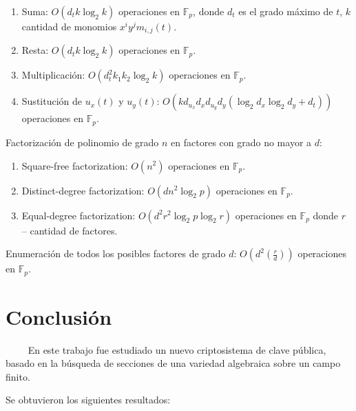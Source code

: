 \documentclass[12pt]{article}
\begin{document}
\begin{enumerate}
\item Suma: $O(d_tk\log_2k)$ operaciones en $\mathbb{F}_p$, donde $d_t$ es el grado m\'aximo de  $t$, $k$ cantidad de monomios $x^iy^jm_{i,j}(t)$.
\item Resta: $O(d_tk\log_2k)$ operaciones en $\mathbb{F}_p$.
\item Multiplicaci\'on: $O(d_t^2k_1k_2\log_2k)$ operaciones en $\mathbb{F}_p$.
\item Sustituci\'on de $u_x(t)$ y $u_y(t)$: $O(kd_{u_x}d_xd_{u_y}d_y(\log_2d_x\log_2d_y+d_t))$ operaciones en $\mathbb{F}_p$.
\end{enumerate}
Factorizaci\'on de polinomio de grado $n$ en factores con grado no mayor a $d$:

\begin{enumerate}
\item Square-free factorization: $O(n^2)$ operaciones en $\mathbb{F}_p$.
\item Distinct-degree factorization: $O(dn^2\log_2p)$ operaciones en $\mathbb{F}_p$.
\item Equal-degree factorization: $O(d^2r^2\log_2p\log_2 r )$ operaciones en $\mathbb{F}_p$ donde $r$ – cantidad de factores.
\end{enumerate}
Enumeraci\'on de todos los posibles factores de grado $d$: $O(d^2(\frac{r}{d}))$ operaciones en $\mathbb{F}_p$.



\section*{Conclusi\'on}

$\qquad$ En este trabajo fue estudiado un nuevo criptosistema de clave p\'ublica, basado en la b\'usqueda de secciones de una variedad algebraica sobre un campo finito.

Se obtuvieron los siguientes resultados:
\end{document}
